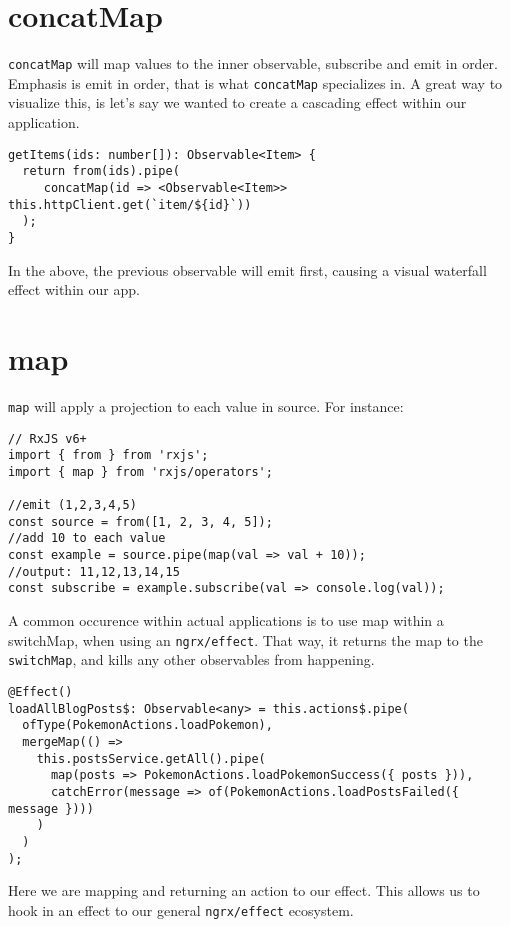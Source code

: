 \section{concatMap}
\lstinline{concatMap} will map values to the inner observable, subscribe and 
emit in order. Emphasis is emit in order, that is what \lstinline{concatMap} 
specializes in. A great way to visualize this, is let's say we wanted to 
create a cascading effect within our application. 

\begin{lstlisting}[caption=data-table.component.ts]
getItems(ids: number[]): Observable<Item> {
  return from(ids).pipe(
     concatMap(id => <Observable<Item>> this.httpClient.get(`item/${id}`))
  );
}
\end{lstlisting}

In the above, the previous observable will emit first, causing a visual 
waterfall effect within our app. 

\section{map} 
\lstinline{map} will apply a projection to each value in source. For instance: 
\begin{lstlisting}[caption=rxjs map example]
// RxJS v6+
import { from } from 'rxjs';
import { map } from 'rxjs/operators';

//emit (1,2,3,4,5)
const source = from([1, 2, 3, 4, 5]);
//add 10 to each value
const example = source.pipe(map(val => val + 10));
//output: 11,12,13,14,15
const subscribe = example.subscribe(val => console.log(val));
\end{lstlisting}

A common occurence within actual applications is to use map within a 
switchMap, when using an \lstinline{ngrx/effect}. That way, it returns the map
to the \lstinline{switchMap}, and kills any other observables from happening.

\begin{lstlisting}[caption=map example]
@Effect()
loadAllBlogPosts$: Observable<any> = this.actions$.pipe(
  ofType(PokemonActions.loadPokemon),
  mergeMap(() =>
    this.postsService.getAll().pipe(
      map(posts => PokemonActions.loadPokemonSuccess({ posts })),
      catchError(message => of(PokemonActions.loadPostsFailed({ message })))
    )
  )
);  
\end{lstlisting}

Here we are mapping and returning an action to our effect. This allows us to 
hook in an effect to our general \lstinline{ngrx/effect} ecosystem.

